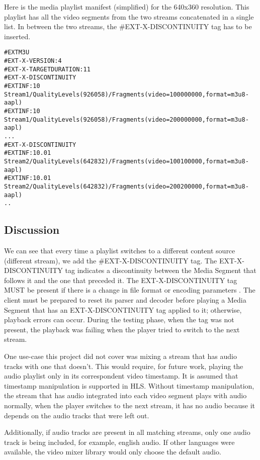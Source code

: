 Here is the media playlist manifest (simplified) for the 640x360 resolution. This playlist has all the video segments from the two streams concatenated in a single list. In between the two streams, the \#EXT-X-DISCONTINUITY tag has to be inserted.

\begin{lstlisting}
#EXTM3U
#EXT-X-VERSION:4
#EXT-X-TARGETDURATION:11
#EXT-X-DISCONTINUITY
#EXTINF:10
Stream1/QualityLevels(926058)/Fragments(video=100000000,format=m3u8-aapl)
#EXTINF:10
Stream1/QualityLevels(926058)/Fragments(video=200000000,format=m3u8-aapl)
...
#EXT-X-DISCONTINUITY
#EXTINF:10.01
Stream2/QualityLevels(642832)/Fragments(video=100100000,format=m3u8-aapl)
#EXTINF:10.01
Stream2/QualityLevels(642832)/Fragments(video=200200000,format=m3u8-aapl)
..
\end{lstlisting}

\subsection{Discussion}

We can see that every time a playlist switches to a different content source (different stream), we add the \#EXT-X-DISCONTINUITY tag. The EXT-X-DISCONTINUITY tag indicates a discontinuity between the Media Segment that follows it and the one that preceded it. The EXT-X-DISCONTINUITY tag MUST be present if there is a change in file format or encoding parameters \cite{refs}. The client must be prepared to reset its parser and decoder before playing a Media Segment that has an EXT-X-DISCONTINUITY tag applied to it; otherwise, playback errors can occur. During the testing phase, when the tag was not present, the playback was failing when the player tried to switch to the next stream.
   
One use-case this project did not cover was mixing a stream that has audio tracks with one that doesn't. This would require, for future work, playing the audio playlist only in its correspondent video timestamp. It is assumed that timestamp manipulation is supported in HLS. Without timestamp manipulation, the stream that has audio integrated into each video segment plays with audio normally, when the player switches to the next stream, it has no audio because it depends on the audio tracks that were left out.

Additionally, if audio tracks are present in all matching streams, only one audio track is being included, for example, english audio. If other languages were available, the video mixer library would only choose the default audio.
